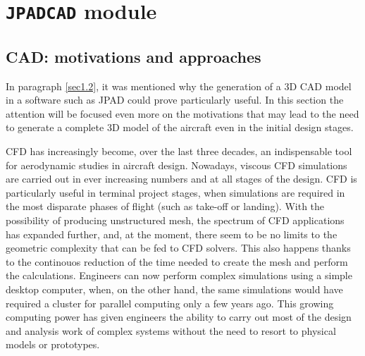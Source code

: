 \chapter{\texttt{JPADCAD} module}
\label{chap2}

\section{CAD: motivations and approaches}
\label{sec2.1}

In paragraph \ref{sec1.2}, it was mentioned why the generation of a 3D \gls{CAD} model in a software such as \gls{JPAD} could prove particularly useful. In this section the attention will be focused even more on the motivations that may lead to the need to generate a complete 3D model of the aircraft even in the initial design stages. 

\bigskip
\noindent
\gls{CFD} has increasingly become, over the last three decades, an indispensable tool for aerodynamic studies in aircraft design. Nowadays, viscous \gls{CFD} simulations are carried out in ever increasing numbers and at all stages of the design. \gls{CFD} is particularly useful in terminal project stages, when simulations are required in the most disparate phases of flight (such as take-off or landing). With the possibility of producing unstructured mesh, the spectrum of \gls{CFD} applications has expanded further, and, at the moment, there seem to be no limits to the geometric complexity that can be fed to \gls{CFD} solvers. This also happens thanks to the continouos reduction of the time needed to create the mesh and perform the calculations. Engineers can now perform complex simulations using a simple desktop computer, when, on the other hand, the same simulations would have required a cluster for parallel computing only a few years ago. This growing computing power has given engineers the ability to carry out most of the design and analysis work of complex systems without the need to resort to physical models or prototypes.

